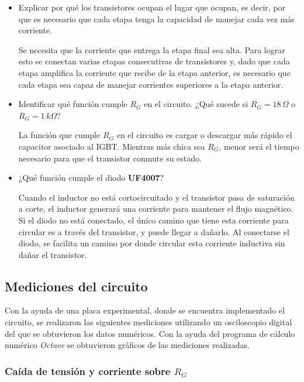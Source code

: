 \documentclass[10pt,spanish,a4paper,openany,notitlepage]{article}
\begin{document}
\begin{itemize}
\item{Explicar por qué los transistores ocupan el lugar que ocupan, es decir, 
por que es necesario que cada etapa tenga la capacidad de manejar cada 
vez más corriente.}

Se necesita que la corriente que entrega la etapa final sea alta. Para 
lograr esto se conectan varias etapas consecutivas de transistores y, 
dado que cada etapa amplifica la corriente que recibe de la etapa anterior, 
es necesario que cada etapa sea capaz de manejar corrientes superiores 
a la etapa anterior.

\item{Identificar qué función cumple $R_G$ en el circuito. 
¿Qué sucede si $R_G=18\,\unit{\Omega}$ o $R_G=1\, \unit{k\Omega}$?}

La función que cumple $R_G$ en el circuito es cargar o descargar más 
rápido el capacitor asociado al IGBT. Mientras más chica sea $R_G$, 
menor será el tiempo necesario para que el transistor conmute su estado.

\item{¿Qué función cumple el diodo {\bf UF4007}?}

Cuando el inductor no está cortocircuitado y el transistor pasa de 
saturación a corte, el inductor generará una corriente para mantener el 
flujo magnético. Si el diodo no está conectado, el único camino que tiene 
esta corriente para circular es a través del transistor, y puede llegar 
a dañarlo. Al conectarse el diodo, se facilita un camino por donde circular 
esta corriente inductiva sin dañar el transistor.

\end{itemize}

\subsection{Mediciones del circuito}

Con la ayuda de una placa experimental, donde se encuentra implementado
el circuito, se realizaron las siguientes mediciones utilizando un
osciloscopio digital del que se obtuvieron los datos numéricos.
Con la ayuda del programa de cálculo numérico \emph{Octave} se obtuvieron
gráficos de las mediciones realizadas.

\subsubsection{Caída de tensión y corriente sobre $R_G$}
\end{document}
